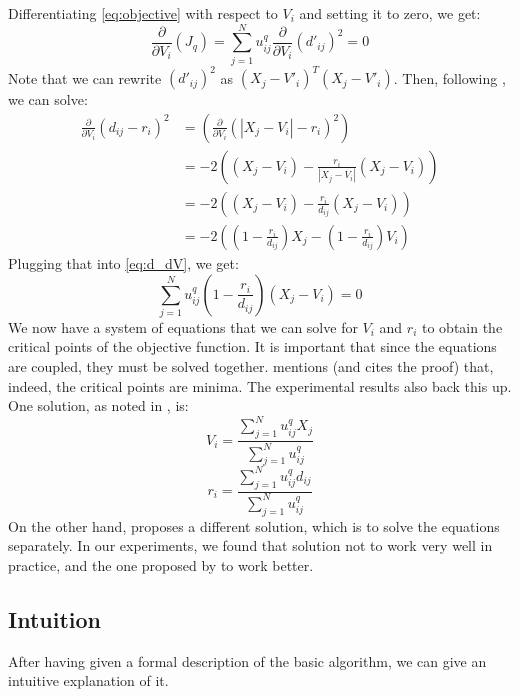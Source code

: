 \documentclass[conference]{IEEEtran}
\begin{document}
Differentiating \eqref{eq:objective} with respect to $V_i$ and setting it to zero, we get:
\begin{equation}\label{eq:d_dV}
\frac{\partial}{\partial V_i}(J_q) = \sum_{j=1}^{N} u_{ij}^q\frac{\partial}{\partial V_i} (d'_{ij})^2 = 0
\end{equation}
Note that we can rewrite $(d'_{ij})^2$ as $(X_j - V'_i)^T(X_j - V'_i)$.
Then, following \cite{308484}, we can solve:
\begin{equation}
\begin{aligned}
\frac{\partial}{\partial V_i} (d_{ij} - r_i)^2 &= \left(\frac{\partial}{\partial V_i} (|X_j - V_i| - r_i)^2\right) \\
&= -2 \left( (X_j - V_i) - \frac{r_i}{|X_j - V_i|} (X_j - V_i) \right) \\
&= -2 \left( (X_j - V_i) - \frac{r_i}{d_{ij}} (X_j - V_i) \right) \\
&= -2 \left( (1 - \frac{r_i}{d_{ij}})X_j - (1 - \frac{r_i}{d_{ij}})V_i \right)
\end{aligned}
\end{equation}
Plugging that into \eqref{eq:d_dV}, we get:
\begin{equation}
\sum_{j=1}^{N} u_{ij}^q (1 - \frac{r_i}{d_{ij}})(X_j - V_i) = 0
\end{equation}
We now have a system of equations that we can solve for $V_i$ and $r_i$ to obtain the critical points of the objective function. It is important that since
the equations are coupled, they must be solved together. \cite{DAVE1992713} mentions (and cites the proof) that, indeed, the critical
points are minima. The experimental results also back this up.
One solution, as noted in \cite{DAVE1992713}, is:
\begin{equation}
V_i = \frac{\sum_{j=1}^{N} u_{ij}^q X_j}{\sum_{j=1}^{N} u_{ij}^q}
\end{equation}
\begin{equation}\label{eq:r_i}
r_i = \frac{\sum_{j=1}^{N} u_{ij}^q d_{ij}}{\sum_{j=1}^{N} u_{ij}^q}
\end{equation}
On the other hand, \cite{308484} proposes a different solution, which is to solve the equations separately. In our experiments, we found that solution not to work very
well in practice, and the one proposed by \cite{DAVE1992713} to work better.

\subsection{Intuition}
After having given a formal description of the basic algorithm, we can give an intuitive explanation of it.
\end{document}

